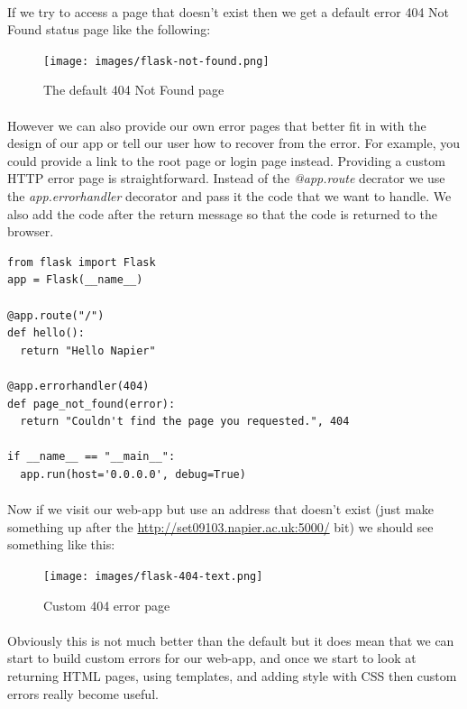 \documentclass[12pt, a4paper, oneside]{book}
\begin{document}
\paragraph{} If we try to access a page that doesn't exist then we get a default error 404 Not Found status page like the following:

\begin{figure}[H]
\centering
\texttt{[image: images/flask-not-found.png]}
\caption{The default 404 Not Found page}
\label{fig:flask-not-found}
\end{figure}

\paragraph{} However we can also provide our own error pages that better fit in with the design of our app or tell our user how to recover from the error. For example, you could provide a link to the root page or login page instead. Providing a custom HTTP error page is straightforward. Instead of the \emph{@app.route} decrator we use the \emph{app.errorhandler} decorator and pass it the code that we want to handle. We also add the code after the return message so that the code is returned to the browser.

\begin{lstlisting}
from flask import Flask
app = Flask(__name__)

@app.route("/")
def hello():
  return "Hello Napier"

@app.errorhandler(404)
def page_not_found(error):
  return "Couldn't find the page you requested.", 404

if __name__ == "__main__":
  app.run(host='0.0.0.0', debug=True)
\end{lstlisting}

\paragraph{} Now if we visit our web-app but use an address that doesn't exist (just make something up after the \url{http://set09103.napier.ac.uk:5000/} bit) we should see something like this:

\begin{figure}[H]
\centering
\texttt{[image: images/flask-404-text.png]}
\caption{Custom 404 error page}
\label{fig:flask-404-text}
\end{figure}

\paragraph{} Obviously this is not much better than the default but it does mean that we can start to build custom errors for our web-app, and once we start to look at returning HTML pages, using templates, and adding style with CSS then custom errors really become useful.
\end{document}
